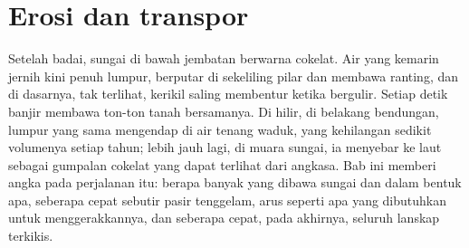\chapter{Erosi dan transpor}\label{ch:b1:erosion-transport}

Setelah badai, sungai di bawah jembatan berwarna cokelat. Air yang kemarin jernih kini penuh lumpur, berputar di sekeliling pilar dan membawa ranting, dan di dasarnya, tak terlihat, kerikil saling membentur ketika bergulir. Setiap detik banjir membawa ton-ton tanah bersamanya. Di hilir, di belakang bendungan, lumpur yang sama mengendap di air tenang waduk, yang kehilangan sedikit volumenya setiap tahun; lebih jauh lagi, di muara sungai, ia menyebar ke laut sebagai gumpalan cokelat yang dapat terlihat dari angkasa. Bab ini memberi angka pada perjalanan itu: berapa banyak yang dibawa sungai dan dalam bentuk apa, seberapa cepat sebutir pasir tenggelam, arus seperti apa yang dibutuhkan untuk menggerakkannya, dan seberapa cepat, pada akhirnya, seluruh lanskap terkikis.


